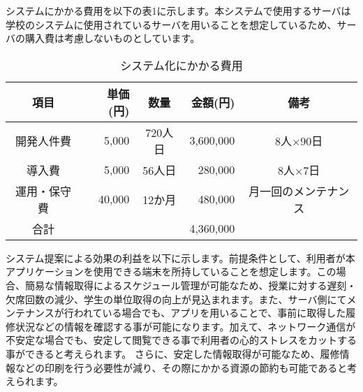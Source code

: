 システムにかかる費用を以下の表1に示します。本システムで使用するサーバは学校のシステムに使用されているサーバを用いることを想定しているため、サーバの購入費は考慮しないものとしています。

\begin{table}[htb]
  \begin{center}
    \caption{システム化にかかる費用}
    \begin{tabular}{|c|r|c|r|c|} \hline
      項目 & 単価(円) & 数量 & 金額(円)& 備考 \\ \hline \hline
      開発人件費 & 5,000 & 720人日 & 3,600,000 & 8人×90日 \\ \hline
      導入費 & 5,000 & 56人日 & 280,000 & 8人×7日 \\ \hline
      運用・保守費 & 40,000 & 12か月 & 480,000 & 月一回のメンテナンス \\ \hline
      合計 & & & 4,360,000 & \\\hline
    \end{tabular}
  \end{center}
\end{table}


システム提案による効果の利益を以下に示します。前提条件として、利用者が本アプリケーションを使用できる端末を所持していることを想定します。この場合、簡易な情報取得によるスケジュール管理が可能なため、授業に対する遅刻・欠席回数の減少、学生の単位取得の向上が見込まれます。また、サーバ側にてメンテナンスが行われている場合でも、アプリを用いることで、事前に取得した履修状況などの情報を確認する事が可能になります。加えて、ネットワーク通信が不安定な場合でも、安定して閲覧できる事で利用者の心的ストレスをカットする事ができると考えられます。
さらに、安定した情報取得が可能なため、履修情報などの印刷を行う必要性が減り、その際にかかる資源の節約も可能であると考えられます。
